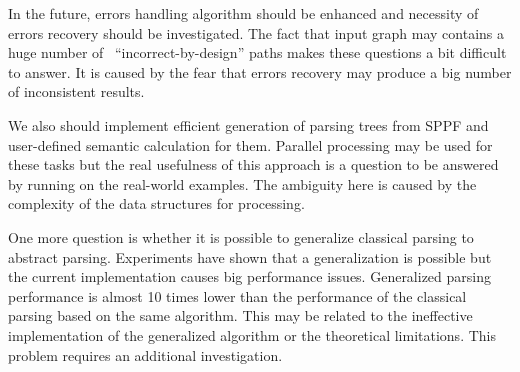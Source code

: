 \documentclass{acm_proc_article-sp}
\begin{document}
In the future, errors handling algorithm should be enhanced and necessity of errors recovery should be investigated.  The fact that input graph may contains a huge number of \ ``incorrect-by-design'' paths makes these questions a bit difficult to answer. It is caused by the fear that errors recovery may produce a big number of inconsistent results.

We also should implement efficient generation of parsing trees from SPPF and user-defined semantic calculation for them. Parallel processing may be used for these tasks but the real usefulness of this approach is a question to be answered by running on the real-world examples. The ambiguity here is caused by the complexity of the data structures for processing. 

One more question is whether it is possible to generalize classical parsing to abstract parsing. Experiments have shown that a generalization is possible but the current implementation causes big performance issues.  Generalized parsing performance is almost 10 times lower than the performance of the classical parsing based on the same algorithm. This may be related to the ineffective implementation of the generalized algorithm or the theoretical limitations. This problem requires an additional investigation.






\balancecolumns
\end{document}
